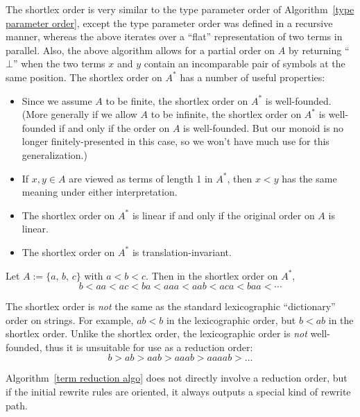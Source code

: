 \documentclass[../generics]{subfiles}
\begin{document}
The shortlex order is very similar to the type parameter order of Algorithm~\ref{type parameter order}, except the type parameter order was defined in a recursive manner, whereas the above iterates over a ``flat'' representation of two terms in parallel. Also, the above algorithm allows for a partial order on $A$ by returning ``$\bot$'' when the two terms $x$ and $y$ contain an incomparable pair of symbols at the same position. The shortlex order on $A^*$ has a number of useful properties:
\begin{itemize}
\item Since we assume $A$ to be finite, the shortlex order on $A^*$ is well-founded. (More generally if we allow $A$ to be infinite, the shortlex order on $A^*$ is well-founded if and only if the order on $A$ is well-founded. But our monoid is no longer finitely-presented in this case, so we won't have much use for this generalization.)
\item If $x,y\in A$ are viewed as terms of length 1 in $A^*$, then $x<y$ has the same meaning under either interpretation.
\item The shortlex order on $A^*$ is linear if and only if the original order on $A$ is linear.
\item The shortlex order on $A^*$ is translation-invariant.
\end{itemize}
\begin{example} Let $A:=\{a,\,b,\,c\}$ with $a<b<c$. Then in the shortlex order on $A^*$,
\[b<aa<ac<ba<aaa<aab<aca<baa<\cdots\]
\end{example}
The shortlex order is \emph{not} the same as the standard lexicographic ``dictionary'' order on strings. For example, $ab<b$ in the lexicographic order, but $b<ab$ in the shortlex order. Unlike the shortlex order, the lexicographic order is \emph{not} well-founded, thus it is unsuitable for use as a reduction order:
\[b>ab>aab>aaab>aaaab>\ldots\]

Algorithm~\ref{term reduction algo} does not directly involve a reduction order, but if the initial rewrite rules are oriented, it always outputs a special kind of rewrite path.
\end{document}
